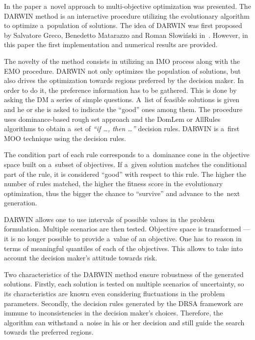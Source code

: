 In the paper a~novel approach to multi-objective optimization was
presented. The DARWIN method is an interactive procedure utilizing the
evolutionary algorithm to optimize a~population of solutions. The idea of
DARWIN was first proposed by Salvatore Greco, Benedetto Matarazzo and Roman
Słowiński in~\cite{GMS10, GMS10b, GMS10c}. However, in this paper the first
implementation and numerical results are provided.

The novelty of the method consists in utilizing an IMO process along
with the EMO procedure. DARWIN not only optimizes the population of
solutions, but also drives the optimization towards regions preferred
by the decision maker. In order to do it, the preference information
has to be gathered. This is done by asking the DM a series of simple
questions. A~list of feasible solutions is given and he or she is
asked to indicate the ``good'' ones among them. The procedure uses
dominance-based rough set approach and the DomLem or AllRules
algorithms to obtain a~set of \textit{``if \dots, then \dots''}
decision rules. DARWIN is a~first MOO technique using the decision
rules.

The condition part of each rule corresponds to a~dominance cone in the
objective space built on a~subset of objectives. If a~given solution matches
the conditional part of the rule, it is considered ``good'' with respect to
this rule. The higher the number of rules matched, the higher the fitness
score in the evolutionary optimization, thus the bigger the chance to
``survive'' and advance to the~next generation.

DARWIN allows one to use intervals of possible values in the problem
formulation. Multiple scenarios are then tested. Objective space is
transformed --- it is no longer possible to provide a~value of an
objective. One has to reason in terms of meaningful quantiles of each of the
objectives. This allows to take into account the decision maker's attitude
towards risk.

Two characteristics of the DARWIN method ensure robustness of the generated
solutions. Firstly, each solution is tested on multiple scenarios of
uncertainty, so its characteristics are known even considering fluctuations in
the problem parameters. Secondly, the decision rules generated by the DRSA
framework are immune to inconsistencies in the decision maker's
choices. Therefore, the algorithm can withstand a~noise in his or her decision
and still guide the search towards the preferred regions.

